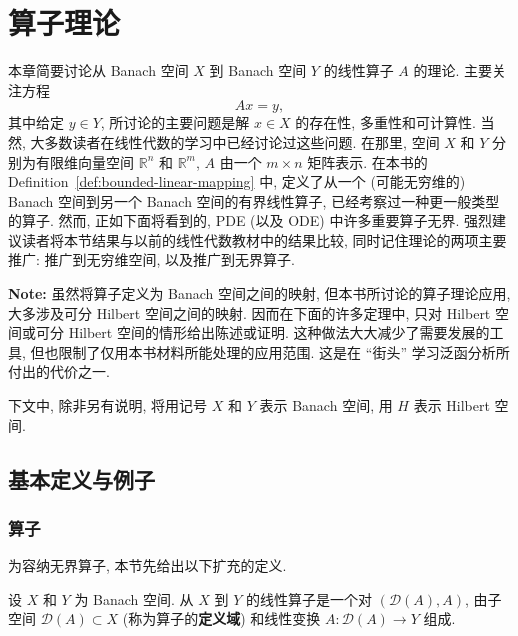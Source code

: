 \section{算子理论}\label{chap:operator-theory}

本章简要讨论从 Banach 空间 $X$ 到 Banach 空间 $Y$ 的线性算子 $A$ 的理论. 主要关注方程
\begin{equation}\label{eq:abstract-linear-operator-equation}
Ax=y,
\end{equation}
其中给定 $y\in Y$, 所讨论的主要问题是解 $x\in X$ 的存在性, 多重性和可计算性. 当然, 大多数读者在线性代数的学习中已经讨论过这些问题. 在那里, 空间 $X$ 和 $Y$ 分别为有限维向量空间 $\mathbb{R}^n$ 和 $\mathbb{R}^m$, $A$ 由一个 $m\times n$ 矩阵表示. 在本书的 Definition~\ref{def:bounded-linear-mapping} 中, 定义了从一个 (可能无穷维的) Banach 空间到另一个 Banach 空间的有界线性算子, 已经考察过一种更一般类型的算子. 然而, 正如下面将看到的, PDE (以及 ODE) 中许多重要算子无界. 强烈建议读者将本节结果与以前的线性代数教材中的结果比较, 同时记住理论的两项主要推广: 推广到无穷维空间, 以及推广到无界算子.

\textbf{Note:} 虽然将算子定义为 Banach 空间之间的映射, 但本书所讨论的算子理论应用, 大多涉及可分 Hilbert 空间之间的映射. 因而在下面的许多定理中, 只对 Hilbert 空间或可分 Hilbert 空间的情形给出陈述或证明. 这种做法大大减少了需要发展的工具, 但也限制了仅用本书材料所能处理的应用范围. 这是在 ``街头'' 学习泛函分析所付出的代价之一.

下文中, 除非另有说明, 将用记号 $X$ 和 $Y$ 表示 Banach 空间, 用 $H$ 表示 Hilbert 空间.

\subsection{基本定义与例子}\label{sec:operator-basic-definitions-examples}

\subsubsection{算子}\label{subsec:operators}

为容纳无界算子, 本节先给出以下扩充的定义.

\begin{Definition}
\label{def:linear-operator-with-specified-domain}
设 $X$ 和 $Y$ 为 Banach 空间. 从 $X$ 到 $Y$ 的线性算子是一个对 $(\mathcal{D}(A),A)$, 由子空间 $\mathcal{D}(A)\subset X$ (称为算子的\textbf{定义域}) 和线性变换 $A:\mathcal{D}(A)\to Y$ 组成.
\end{Definition}


